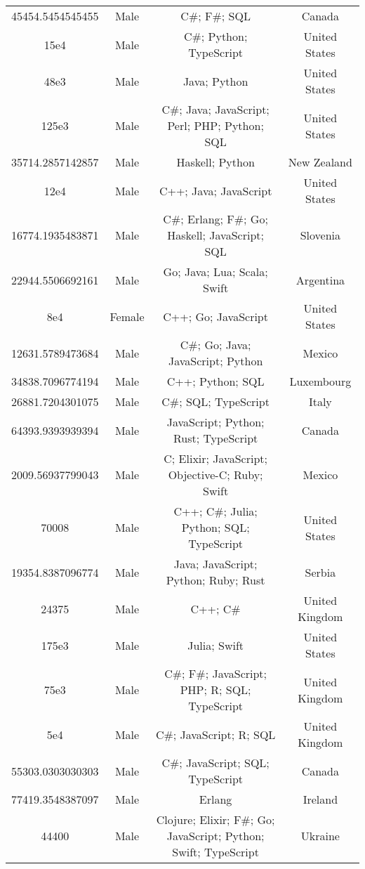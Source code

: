 \begin{center}
\begin{tabular}{ |c|c|c|c| }
45454.5454545455  &  Male  &  C\#; F\#; SQL  &  Canada  \\ 
15e4  &  Male  &  C\#; Python; TypeScript  &  United States  \\ 
48e3  &  Male  &  Java; Python  &  United States  \\ 
125e3  &  Male  &  C\#; Java; JavaScript; Perl; PHP; Python; SQL  &  United States  \\ 
35714.2857142857  &  Male  &  Haskell; Python  &  New Zealand  \\ 
12e4  &  Male  &  C++; Java; JavaScript  &  United States  \\ 
16774.1935483871  &  Male  &  C\#; Erlang; F\#; Go; Haskell; JavaScript; SQL  &  Slovenia  \\ 
22944.5506692161  &  Male  &  Go; Java; Lua; Scala; Swift  &  Argentina  \\ 
8e4  &  Female  &  C++; Go; JavaScript  &  United States  \\ 
12631.5789473684  &  Male  &  C\#; Go; Java; JavaScript; Python  &  Mexico  \\ 
34838.7096774194  &  Male  &  C++; Python; SQL  &  Luxembourg  \\ 
26881.7204301075  &  Male  &  C\#; SQL; TypeScript  &  Italy  \\ 
64393.9393939394  &  Male  &  JavaScript; Python; Rust; TypeScript  &  Canada  \\ 
2009.56937799043  &  Male  &  C; Elixir; JavaScript; Objective-C; Ruby; Swift  &  Mexico  \\ 
70008  &  Male  &  C++; C\#; Julia; Python; SQL; TypeScript  &  United States  \\ 
19354.8387096774  &  Male  &  Java; JavaScript; Python; Ruby; Rust  &  Serbia  \\ 
24375  &  Male  &  C++; C\#  &  United Kingdom  \\ 
175e3  &  Male  &  Julia; Swift  &  United States  \\ 
75e3  &  Male  &  C\#; F\#; JavaScript; PHP; R; SQL; TypeScript  &  United Kingdom  \\ 
5e4  &  Male  &  C\#; JavaScript; R; SQL  &  United Kingdom  \\ 
55303.0303030303  &  Male  &  C\#; JavaScript; SQL; TypeScript  &  Canada  \\ 
77419.3548387097  &  Male  &  Erlang  &  Ireland  \\ 
44400  &  Male  &  Clojure; Elixir; F\#; Go; JavaScript; Python; Swift; TypeScript  &  Ukraine  \\ 

\end{tabular}
\end{center}
